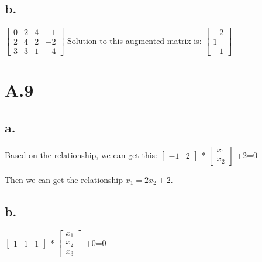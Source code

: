 \documentclass{article}
\begin{document}
\subsection{b.}
$\left[\begin{array}{ccc|c}
0 & 2 & 4 & -1\\
2 & 4 & 2 & -2\\
3 & 3 & 1 & -4
\end{array}\right]$\newline
Solution to this augmented matrix is:
$\begin{bmatrix}
-2\\
1\\
-1
\end{bmatrix}$

\section{A.9}
\subsection{a.}
Based on the relationship, we can get this:
$\begin{bmatrix}
-1 & 2
\end{bmatrix}$
*
$\begin{bmatrix}
x_1\\
x_2
\end{bmatrix}$
+2=0 \newline

Then we can get the relationship $x_1 = 2x_2+2$.



\subsection{b.}
$\begin{bmatrix}
1 & 1 & 1
\end{bmatrix}$
*
$\begin{bmatrix}
x_1\\
x_2\\
x_3
\end{bmatrix}$
+0=0 \newline
\end{document}
